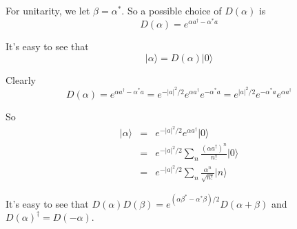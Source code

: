 \documentclass[12pt]{book}
\begin{document}
	For unitarity, we let $\beta=\alpha^*$. So a possible choice of $D(\alpha)$ is
	\begin{equation}
		D(\alpha)=e^{\alpha a^\dagger-\alpha^*a}
	\end{equation}
	
	It's easy to see that 
	\begin{equation}
		|\alpha\rangle=D(\alpha)|0\rangle
	\end{equation}
	
	Clearly
	\begin{equation}
		D(\alpha)=e^{\alpha a^\dagger-\alpha^*a}=e^{-|a|^2/2}e^{\alpha a^\dagger}e^{-\alpha^*a}=e^{|a|^2/2}e^{-\alpha^*a}e^{\alpha a^\dagger}
	\end{equation}
	
	So
	\begin{eqnarray}
		|\alpha\rangle&=&e^{-|a|^2/2}e^{\alpha a^\dagger}|0\rangle\\
		&=&e^{-|a|^2/2}\sum_n \frac{(\alpha a^\dagger)^n}{n!}|0\rangle\\
		&=&e^{-|a|^2/2}\sum_n \frac{\alpha^n}{\sqrt{n!}}|n\rangle
	\end{eqnarray}
	
	It's easy to see that $D(\alpha)D(\beta)=e^{(\alpha\beta^*-\alpha^*\beta)/2}D(\alpha+\beta)$ and $D(\alpha)^\dagger=D(-\alpha)$.
	
\end{document}
